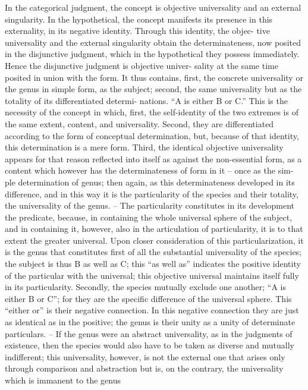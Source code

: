 In the categorical judgment, the concept is objective universality and an
external singularity. In the hypothetical, the concept manifests its presence
in this externality, in its negative identity. Through this identity, the objec-
tive universality and the external singularity obtain the determinateness,
now posited in the disjunctive judgment, which in the hypothetical they
possess immediately. Hence the disjunctive judgment is objective univer-
sality at the same time posited in union with the form. It thus contains,
first, the concrete universality or the genus in simple form, as the subject;
second, the same universality but as the totality of its differentiated determi-
nations. “A is either B or C.” This is the necessity of the concept in which,
first, the self-identity of the two extremes is of the same extent, content,
and universality. Second, they are differentiated according to the form of
conceptual determination, but, because of that identity, this determination
is a mere form. Third, the identical objective universality appears for that
reason reflected into itself as against the non-essential form, as a content
which however has the determinateness of form in it – once as the sim-
ple determination of genus; then again, as this determinateness developed
in its difference, and in this way it is the particularity of the species and
their totality, the universality of the genus. – The particularity constitutes in
its development the predicate, because, in containing the whole universal
sphere of the subject, and in containing it, however, also in the articulation
of particularity, it is to that extent the greater universal.
Upon closer consideration of this particularization, it is the genus that
constitutes first of all the substantial universality of the species; the subject
is thus B as well as C; this “as well as” indicates the positive identity of the
particular with the universal; this objective universal maintains itself fully
in its particularity. Secondly, the species mutually exclude one another; “A is
either B or C”; for they are the specific difference of the universal sphere.
This “either or” is their negative connection. In this negative connection
they are just as identical as in the positive; the genus is their unity as a unity
of determinate particulars. – If the genus were an abstract universality,
as in the judgments of existence, then the species would also have to
be taken as diverse and mutually indifferent; this universality, however, is
not the external one that arises only through comparison and abstraction
but is, on the contrary, the universality which is immanent to the genus

